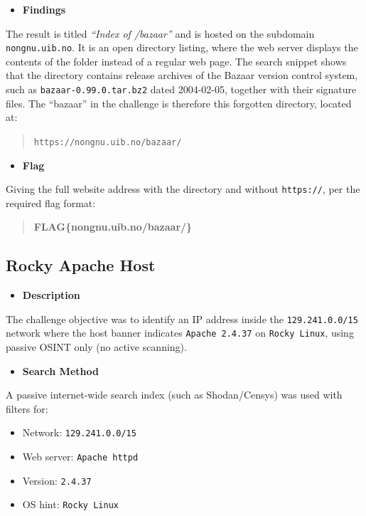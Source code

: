 \documentclass[11pt]{article}
\begin{document}
\begin{itemize}[leftmargin=1.5em]
    \item \textbf{Findings}
\end{itemize}
\noindent The result is titled \emph{``Index of /bazaar''} and is hosted on the subdomain \texttt{nongnu.uib.no}. It is an open directory listing, where the web server displays the contents of the folder instead of a regular web page. The search snippet shows that the directory contains release archives of the Bazaar version control system, such as \texttt{bazaar-0.99.0.tar.bz2} dated 2004-02-05, together with their signature files. The ``bazaar'' in the challenge is therefore this forgotten directory, located at:

\begin{quote}
\texttt{https://nongnu.uib.no/bazaar/}
\end{quote}

\begin{itemize}[leftmargin=1.5em]
    \item \textbf{Flag}
\end{itemize}
\noindent Giving the full website address with the directory and without \texttt{https://}, per the required flag format:

\begin{quote}
\textbf{FLAG\{nongnu.uib.no/bazaar/\}}
\end{quote}

\subsection{Rocky Apache Host}

\begin{itemize}[leftmargin=1.5em]
    \item \textbf{Description}
\end{itemize}
\noindent The challenge objective was to identify an IP address inside the \texttt{129.241.0.0/15} network where the host banner indicates \texttt{Apache 2.4.37} on \texttt{Rocky Linux}, using passive OSINT only (no active scanning).

\begin{itemize}[leftmargin=1.5em]
    \item \textbf{Search Method}
\end{itemize}
\noindent A passive internet-wide search index (such as Shodan/Censys) was used with filters for:
\begin{itemize}[leftmargin=2.2em]
    \item Network: \texttt{129.241.0.0/15}
    \item Web server: \texttt{Apache httpd}
    \item Version: \texttt{2.4.37}
    \item OS hint: \texttt{Rocky Linux}
\end{itemize}
\end{document}
